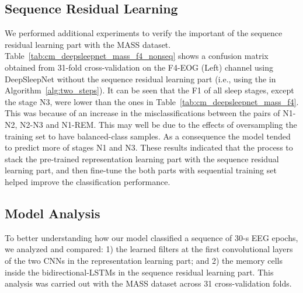 \documentclass[journal,twoside]{IEEEtran}
\begin{document}
\subsection{Sequence Residual Learning} \label{sec:seq_res_learn}
We performed additional experiments to verify the important of the sequence residual learning part with the MASS dataset.
Table~\ref{tab:cm_deepsleepnet_mass_f4_nonseq} shows a confusion matrix obtained from 31-fold cross-validation on the F4-EOG (Left) channel using DeepSleepNet without the sequence residual learning part (i.e., using the  in Algorithm~\ref{alg:two_steps}). It can be seen that the F1 of all sleep stages, except the stage N3, were lower than the ones in Table~\ref{tab:cm_deepsleepnet_mass_f4}. This was because of an increase in the misclassifications between the pairs of N1-N2, N2-N3 and N1-REM. This may well be due to the effects of oversampling the training set to have balanced-class samples. As a consequence the model tended to predict more of stages N1 and N3. These results indicated that the process to stack the pre-trained representation learning part with the sequence residual learning part, and then fine-tune the both parts with sequential training set helped improve the classification performance.

\subsection{Model Analysis} \label{sec:model_analysis}
To better understanding how our model classified a sequence of 30-s EEG epochs, we analyzed and compared: 1) the learned filters at the first convolutional layers of the two CNNs in the representation learning part; and 2) the memory cells inside the bidirectional-LSTMs in the sequence residual learning part. This analysis was carried out with the MASS dataset across 31 cross-validation folds.
\end{document}
